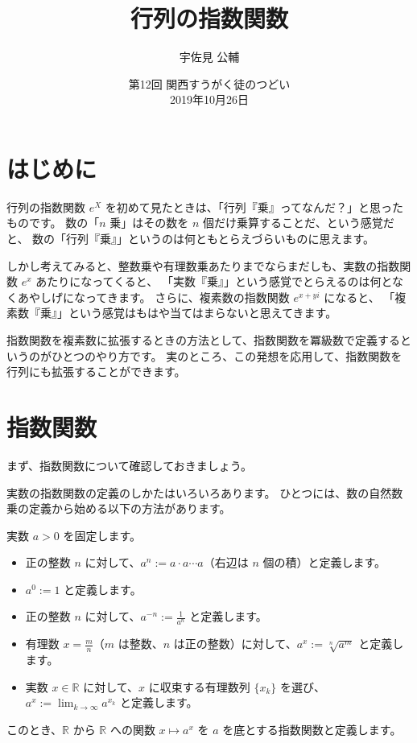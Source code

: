 \documentclass[a5paper]{ltjsarticle}
\title{行列の指数関数}
\author{宇佐見 公輔}
\date{第12回 関西すうがく徒のつどい\\2019年10月26日}
\begin{document}
\maketitle

\section{はじめに}

行列の指数関数 \(e^X\) を初めて見たときは、「行列『乗』ってなんだ？」と思ったものです。
数の「\(n\) 乗」はその数を \(n\) 個だけ乗算することだ、という感覚だと、
数の「行列『乗』」というのは何ともとらえづらいものに思えます。

しかし考えてみると、整数乗や有理数乗あたりまでならまだしも、実数の指数関数 \(e^x\) あたりになってくると、
「実数『乗』」という感覚でとらえるのは何となくあやしげになってきます。
さらに、複素数の指数関数 \(e^{x + yi}\) になると、
「複素数『乗』」という感覚はもはや当てはまらないと思えてきます。

指数関数を複素数に拡張するときの方法として、指数関数を冪級数で定義するというのがひとつのやり方です。
実のところ、この発想を応用して、指数関数を行列にも拡張することができます。

\section{指数関数}

まず、指数関数について確認しておきましょう。

実数の指数関数の定義のしかたはいろいろあります。
ひとつには、数の自然数乗の定義から始める以下の方法があります。

\begin{usmdefinition}[実数の指数関数]\label{実数の指数関数}
    実数 \(a > 0\) を固定します。
    \begin{itemize}
        \item 正の整数 \(n\) に対して、\(a^n := a \cdot a \cdots a\)（右辺は \(n\) 個の積）と定義します。
        \item \(a^0 := 1\) と定義します。
        \item 正の整数 \(n\) に対して、\(a^{-n} := \frac{1}{a^n}\) と定義します。
        \item 有理数 \(x = \frac{m}{n}\)（\(m\) は整数、\(n\) は正の整数）に対して、\(a^x := \sqrt[n]{a^m}\) と定義します。
        \item 実数 \(x \in \mathbb{R}\) に対して、\(x\) に収束する有理数列 \( \{x_k\} \) を選び、
              \(\displaystyle a^x := \lim_{k \to \infty} a^{x_k}\) と定義します。
    \end{itemize}

    このとき、\(\mathbb{R}\) から \(\mathbb{R}\) への関数 \(x \mapsto a^x\) を \(a\) を底とする指数関数と定義します。
\end{usmdefinition}
\end{document}
